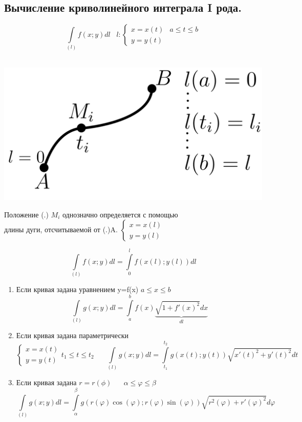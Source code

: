 \documentclass[12pt]{article}
\let\ORIincludegraphics\includegraphics
\renewcommand{\includegraphics}[2][]{\ORIincludegraphics[scale=0.65,#1]{#2}}
\let\oldint\int
\renewcommand{\int}{\oldint\limits}
\begin{document}
  \subsection{Вычисление криволинейного интеграла I рода.}
  \[\int_{(l)} f(x;y) dl \hspace{10pt} l: \begin{cases}
    x=x(t) & a\leq t\leq b\\
    y=y(t)
  \end{cases}\] \\
  \begin{minipage}{0.45\textwidth}
    \includegraphics[scale=0.4]{8.2.1.png}
  \end{minipage}
  \hspace{1em}
  \begin{minipage}{0.65\textwidth}
    Положение (.) $M_i$ однозначно определяется с помощью \\
    длины дуги, отсчитываемой от (.)A. $\begin{cases}
      x=x(l)\\
      y=y(l)
    \end{cases}$
  \end{minipage}
  \vspace{1em}
  \par
  \[\int_{(l)}f(x;y)dl=\int_{0}^{l} f(x(l);y(l))dl\]
  \begin{enumerate}
    \item Если кривая задана уравнением y=f(x) $a \leq x \leq b$\\
    \[\int_{(l)} g(x;y)dl = \int_{a}^{b} f(x) \underbrace{\sqrt{1+f'(x)^2}dx}_{dl}\]
    \item Если кривая задана параметрически\\
    \[\begin{cases}
      x=x(t)\\
      y=y(t)
    \end{cases} t_1 \leq t \leq t_2 \hspace{20pt} \int_{(l)}g(x;y)dl=\int_{t_1}^{t_2}g(x(t);y(t))
    \sqrt{x'(t)^2+y'(t)^2}dt\]
    \item Если кривая задана $r=r(\phi) \hspace{20pt} \alpha \leq \varphi \leq \beta$\\
    \[\int_{(l)}g(x;y)dl = \int_{\alpha}^{\beta} g(r(\varphi)\cos(\varphi);r(\varphi)\sin(\varphi))
    \sqrt{r^2(\varphi)+r'(\varphi)^2}d\varphi\]
  \end{enumerate}
\end{document}
